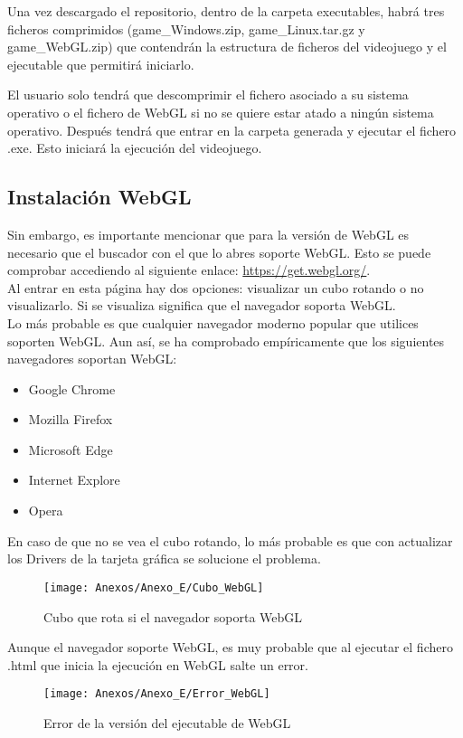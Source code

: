 Una vez descargado el repositorio, dentro de la carpeta executables, habrá tres ficheros comprimidos (game\_Windows.zip, game\_Linux.tar.gz y game\_WebGL.zip) que contendrán la estructura de ficheros del videojuego y el ejecutable que permitirá iniciarlo.

El usuario solo tendrá que descomprimir el fichero asociado a su sistema operativo o el fichero de WebGL si no se quiere estar atado a ningún sistema operativo. Después tendrá que entrar en la carpeta generada y ejecutar el fichero .exe. Esto iniciará la ejecución del videojuego.

\subsection{Instalación WebGL}
Sin embargo, es importante mencionar que para la versión de WebGL es necesario que el buscador con el que lo abres soporte WebGL. Esto se puede comprobar accediendo al siguiente enlace: \url{https://get.webgl.org/}.\\ 
Al entrar en esta página hay dos opciones: visualizar un cubo rotando o no visualizarlo. Si se visualiza significa que el navegador soporta WebGL.\\
Lo más probable es que cualquier navegador moderno popular que utilices soporten WebGL. Aun así, se ha comprobado empíricamente que los siguientes navegadores soportan WebGL:
\begin{itemize}
\item
Google Chrome
\item
Mozilla Firefox
\item
Microsoft Edge
\item
Internet Explore
\item
Opera
\end{itemize}

En caso de que no se vea el cubo rotando, lo más probable es que con actualizar los Drivers de la tarjeta gráfica se solucione el problema.

\clearpage
\begin{figure}[h]
\centering
\texttt{[image: Anexos/Anexo\_E/Cubo\_WebGL]}
\caption{Cubo que rota si el navegador soporta WebGL}
\end{figure}

Aunque el navegador soporte WebGL, es muy probable que al ejecutar el fichero .html que inicia la ejecución en WebGL salte un error.

\begin{figure}[h]
\centering
\texttt{[image: Anexos/Anexo\_E/Error\_WebGL]}
\caption{Error de la versión del ejecutable de WebGL}
\end{figure}

